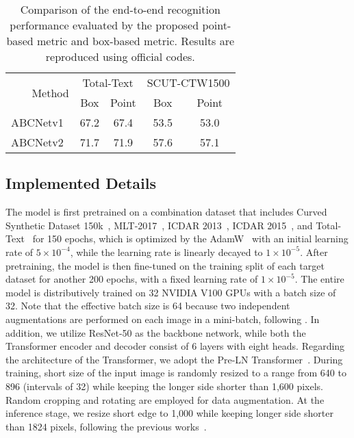 \documentclass[sigconf]{acmart}
\begin{document}
\begin{table}[t!]
    \centering
    \caption{Comparison of the end-to-end recognition performance evaluated by the proposed point-based metric and box-based metric. Results are reproduced using official codes.}
    \label{tab:ab_metric}
    \footnotesize
    \begin{tabular}{r|cc|cc}\hline
\multirow{2}{*}{Method} & \multicolumn{2}{c|}{Total-Text} & \multicolumn{2}{c}{SCUT-CTW1500} \\ \cline{2-5}
         & \multicolumn{1}{c|}{Box} & Point & \multicolumn{1}{c|}{Box} & \multicolumn{1}{c}{Point} \\ \hline
ABCNetv1~\cite{liu2020abcnet} & 67.2 & 67.4 & 53.5 & 53.0  \\
ABCNetv2~\cite{liu2021abcnetv2} & 71.7 & 71.9 & 57.6 & 57.1 \\ \hline
    \end{tabular}
\end{table}


\subsection{Implemented Details}
The model is first pretrained on a combination dataset that includes Curved Synthetic Dataset 150k~\cite{liu2020abcnet}, MLT-2017~\cite{nayef2017icdar2017}, ICDAR 2013~\cite{karatzas2013icdar}, ICDAR 2015~\cite{karatzas2015icdar}, and Total-Text~\cite{ch2017total} for 150 epochs, which is optimized by the AdamW~\cite{loshchilov2017decoupled} with an initial learning rate of $5\times 10^{-4}$, while the learning rate is linearly decayed to $1\times 10^{-5}$. After pretraining, the model is then fine-tuned on the training split of each target dataset for another 200 epochs, with a fixed learning rate of $1\times 10^{-5}$. The entire model is distributively trained on 32 NVIDIA V100 GPUs with a batch size of 32. Note that the effective batch size is 64 because two independent augmentations are performed on each image in a mini-batch, following \cite{chen2021pix2seq,hoffer2020augment}. In addition, we utilize ResNet-50 as the backbone network, while both the Transformer encoder and decoder consist of 6 layers with eight heads. Regarding the architecture of the Transformer, we adopt the Pre-LN Transformer~\cite{xiong2020layer}.
During training, short size of the input image is randomly resized to a range from 640 to 896 (intervals of 32) while keeping the longer side shorter than 1,600 pixels. Random cropping and rotating are employed for data augmentation. At the inference stage, we resize short edge to 1,000 while keeping longer side shorter than 1824 pixels, following the previous works~\cite{liu2020abcnet,liu2021abcnetv2}.
\end{document}
